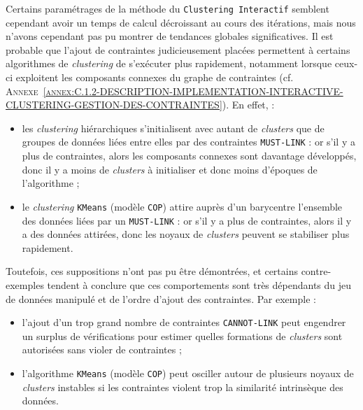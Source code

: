 			\begin{leftBarAuthorOpinion}
				Certains paramétrages de la méthode du \texttt{Clustering Interactif} semblent cependant avoir un temps de calcul décroissant au cours des itérations, mais nous n'avons cependant pas pu montrer de tendances globales significatives.
				Il est probable que l'ajout de contraintes judicieusement placées permettent à certains algorithmes de \textit{clustering} de s'exécuter plus rapidement, notamment lorsque ceux-ci exploitent les composants connexes du graphe de contraintes (cf. \textsc{Annexe~\ref{annex:C.1.2-DESCRIPTION-IMPLEMENTATION-INTERACTIVE-CLUSTERING-GESTION-DES-CONTRAINTES}}).
				En effet, :
				\begin{itemize}
					\item les \textit{clustering} hiérarchiques s'initialisent avec autant de \textit{clusters} que de groupes de données liées entre elles par des contraintes \texttt{MUST-LINK} : or s'il y a plus de contraintes, alors les composants connexes sont davantage développés, donc il y a moins de \textit{clusters} à initialiser et donc moins d'époques de l'algorithme ;
					\item le \textit{clustering} \texttt{KMeans} (modèle \texttt{COP}) attire auprès d'un barycentre l'ensemble des données liées par un \texttt{MUST-LINK} : or s'il y a plus de contraintes, alors il y a des données attirées, donc les noyaux de \textit{clusters} peuvent se stabiliser plus rapidement.  
				\end{itemize}
				Toutefois, ces suppositions n'ont pas pu être démontrées, et certains contre-exemples tendent à conclure que ces comportements sont très dépendants du jeu de données manipulé et de l'ordre d'ajout des contraintes. Par exemple :
				\begin{itemize}
					\item l'ajout d'un trop grand nombre de contraintes \texttt{CANNOT-LINK} peut engendrer un surplus de vérifications pour estimer quelles formations de \textit{clusters} sont autorisées sans violer de contraintes ;
					\item l'algorithme \texttt{KMeans} (modèle \texttt{COP}) peut osciller autour de plusieurs noyaux de \textit{clusters} instables si les contraintes violent trop la similarité intrinsèque des données.
				\end{itemize}
			\end{leftBarAuthorOpinion}
			
